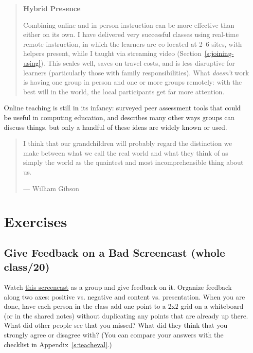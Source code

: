 \begin{quote}\setlength{\parindent}{0pt}
\textbf{Hybrid Presence}

Combining online and in-person instruction can be more effective than
either on its own. I have delivered very successful classes using
real-time remote instruction, in which the learners are co-located at
2--6 sites, with helpers present, while I taught via streaming video
(Section~\ref{s:joining-using}). This scales well, saves on travel
costs, and is less disruptive for learners (particularly those with
family responsibilities). What \emph{doesn't} work is having one group in
person and one or more groups remotely: with the best will in the
world, the local participants get far more attention.
\end{quote}

Online teaching is still in its infancy: \cite{Luxt2009} surveyed
peer assessment tools that could be useful in computing education, and
\cite{Broo2016} describes many other ways groups can discuss things,
but only a handful of these ideas are widely known or used.

\begin{quote}\setlength{\parindent}{0pt}
I think that our grandchildren will probably regard the distinction we
make between what we call the real world and what they think of as
simply the world as the quaintest and most incomprehensible thing
about us.

--- William Gibson
\end{quote}

\section{Exercises}\label{s:online-exercises}

\subsection{Give Feedback on a Bad Screencast (whole class/20)}\label{give-feedback-on-a-bad-screencast-whole-class20}

Watch \href{https://youtu.be/xcnoHaxXvdQ}{this screencast} as a group and give
feedback on it. Organize feedback along two axes: positive
vs. negative and content vs. presentation. When you are done, have
each person in the class add one point to a 2x2 grid on a whiteboard
(or in the shared notes) without duplicating any points that are
already up there. What did other people see that you missed? What did
they think that you strongly agree or disagree with? (You can compare
your answers with the checklist in Appendix~\ref{s:teacheval}.)

